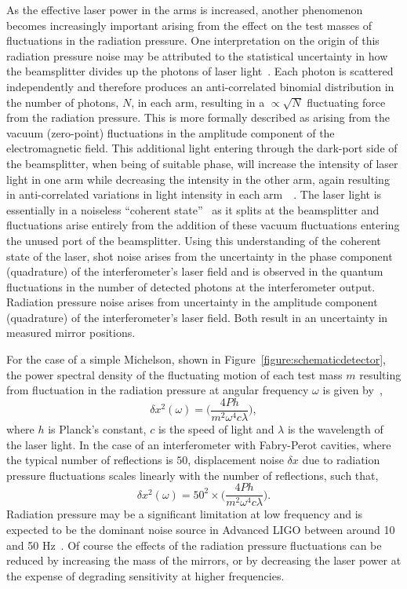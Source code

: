 \documentclass{article}
\begin{document}
As the effective laser power in the arms is increased, another phenomenon
becomes increasingly important arising from the effect on the test masses of
fluctuations in the radiation pressure. One interpretation on the origin of this
radiation pressure noise may be attributed to the statistical uncertainty in how
the beamsplitter divides up the photons of laser light~\cite{Edelstein}. Each
photon is scattered independently and therefore produces an anti-correlated
binomial distribution in the number of photons, $N$, in each arm, resulting in a
$\propto\sqrt{N}$ fluctuating force from the radiation pressure. This is more
formally described as arising from the vacuum (zero-point) fluctuations in the
amplitude component of the electromagnetic field. This additional light entering
through the dark-port side of the beamsplitter, when being of suitable phase,
will increase the intensity of laser light in one arm while decreasing the
intensity in the other arm, again resulting in anti-correlated variations in
light intensity in each arm~\cite{Caves1}~\cite{Caves2}. The laser light is
essentially in a noiseless ``coherent state''~\cite{Glauber:1963} as it splits
at the beamsplitter and fluctuations arise entirely from the addition
of these vacuum fluctuations entering the unused port of the beamsplitter. Using
this understanding of the coherent state of the laser, shot noise arises from
the uncertainty in the phase component (quadrature) of the interferometer's
laser field and is observed in the quantum fluctuations in the number of
detected photons at the interferometer output. Radiation pressure noise arises
from uncertainty in the amplitude component (quadrature) of the interferometer's
laser field. Both result in an uncertainty in measured mirror positions.

For the case of a simple Michelson, shown in
Figure~\ref{figure:schematicdetector}, the power spectral density of the
fluctuating motion of each test mass $m$ resulting from fluctuation in the
radiation pressure at angular frequency $\omega$ is given by~\cite{Edelstein},
\begin{equation}
\delta x^2(\omega) = \biggl(\frac{4 P h}{m^2 \omega^4 c
\lambda}\biggr),
 \label{equ:radiation-pressure}
\end{equation}
where $h$ is Planck's constant, $c$ is the speed of light and $\lambda$ is the
wavelength of the laser light. In the case of an interferometer with Fabry-Perot
cavities, where the typical number of reflections is $50$, displacement noise
$\delta x$ due to radiation pressure fluctuations scales linearly with the
number of reflections, such that,
\begin{equation}
\delta x^2(\omega) = 50^2 \times \biggl(\frac{4 P h}{m^2 \omega^4
c \lambda}\biggr).
 \label{equ:radiation-pressure}
\end{equation}
Radiation pressure may be a significant limitation at low frequency and is
expected to be the dominant noise source in Advanced LIGO between around 10 and
50 Hz~\cite{Harry:2010}. Of course the effects of the radiation pressure
fluctuations can be reduced by increasing the mass of the mirrors, or by
decreasing the laser power at the expense of degrading sensitivity at higher
frequencies.
\end{document}
